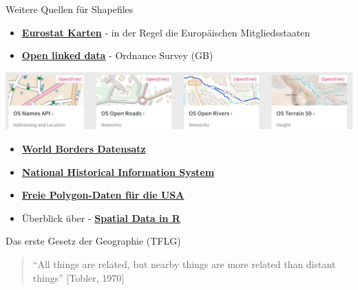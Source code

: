\documentclass[ignorenonframetext,]{beamer}
\begin{document}
\begin{frame}{Weitere Quellen für Shapefiles}

\begin{itemize}
\item
  \href{http://epp.eurostat.ec.europa.eu/portal/page/portal/gisco_Geographical_information_maps/popups/\%20references/administrative_units_statistical_units_1}{\textbf{Eurostat
  Karten}} - in der Regel die Europäischen Mitgliedsstaaten
\item
  \href{https://www.ordnancesurvey.co.uk/business-and-government/products/opendata-products-grid.html}{\textbf{Open
  linked data}} - Ordnance Survey (GB)
\end{itemize}

\includegraphics{figure/OpenLinkedData.PNG}

\begin{itemize}
\item
  \href{http://thematicmapping.org/downloads/world_borders.php}{\textbf{World
  Borders Datensatz}}
\item
  \href{https://www.nhgis.org/}{\textbf{National Historical Information
  System}}
\item
  \href{http://www.freemapdata.com/html/free_polygon_data.html}{\textbf{Freie
  Polygon-Daten für die USA}}
\item
  Überblick über -
  \href{https://science.nature.nps.gov/im/datamgmt/statistics/r/advanced/spatial.cfm}{\textbf{Spatial
  Data in R}}
\end{itemize}

\end{frame}

\begin{frame}{Das erste Gesetz der Geographie (TFLG)}

\begin{quote}
``All things are related, but nearby things are more related than
distant things'' {[}Tobler, 1970{]}
\end{quote}

\end{frame}
\end{document}
